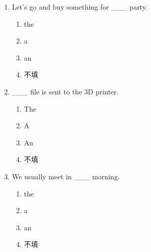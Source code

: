 \documentclass[11pt,a4paper]{ctexart}
\begin{document}
\begin{enumerate}[leftmargin=*,itemsep=4pt]
\begin{enumerate}[label=\Alph*.,leftmargin=2em,itemsep=1pt,topsep=2pt]
\item 不填
\end{enumerate}
\item Let’s go and buy something for \_\_\_ party.
\begin{enumerate}[label=\Alph*.,leftmargin=2em,itemsep=1pt,topsep=2pt]
\item the
\item a
\item an
\item 不填
\end{enumerate}
\item \_\_\_ file is sent to the 3D printer.
\begin{enumerate}[label=\Alph*.,leftmargin=2em,itemsep=1pt,topsep=2pt]
\item The
\item A
\item An
\item 不填
\end{enumerate}
\item We usually meet in \_\_\_ morning.
\begin{enumerate}[label=\Alph*.,leftmargin=2em,itemsep=1pt,topsep=2pt]
\item the
\item a
\item an
\item 不填
\end{enumerate}
\end{enumerate}
\end{document}
